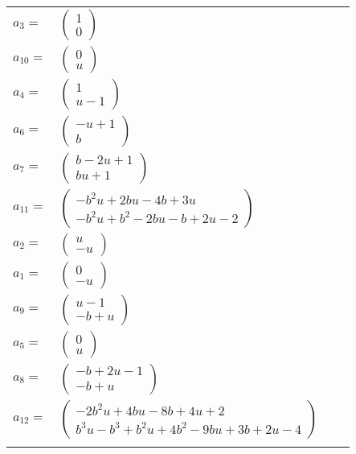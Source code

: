 \documentclass[1p]{elsarticle_modified}
\theoremstyle{definition}
\begin{document}
\begin{tabular}{m{7pt} m{180pt} m{7pt} m{180pt} }
\flushright $a_{3}=$&$\begin{pmatrix}1\\0\end{pmatrix}$ \\
\flushright $a_{10}=$&$\begin{pmatrix}0\\u\end{pmatrix}$ \\
\flushright $a_{4}=$&$\begin{pmatrix}1\\u-1\end{pmatrix}$ \\
\flushright $a_{6}=$&$\begin{pmatrix}- u+1\\b\end{pmatrix}$ \\
\flushright $a_{7}=$&$\begin{pmatrix}b-2 u+1\\b u+1\end{pmatrix}$ \\
\flushright $a_{11}=$&$\begin{pmatrix}- b^2 u+2 b u-4 b+3 u\\- b^2 u+b^2-2 b u- b+2 u-2\end{pmatrix}$ \\
\flushright $a_{2}=$&$\begin{pmatrix}u\\- u\end{pmatrix}$ \\
\flushright $a_{1}=$&$\begin{pmatrix}0\\- u\end{pmatrix}$ \\
\flushright $a_{9}=$&$\begin{pmatrix}u-1\\- b+u\end{pmatrix}$ \\
\flushright $a_{5}=$&$\begin{pmatrix}0\\u\end{pmatrix}$ \\
\flushright $a_{8}=$&$\begin{pmatrix}- b+2 u-1\\- b+u\end{pmatrix}$ \\
\flushright $a_{12}=$&$\begin{pmatrix}-2 b^2 u+4 b u-8 b+4 u+2\\b^3 u- b^3+b^2 u+4 b^2-9 b u+3 b+2 u-4\end{pmatrix}$\\&\end{tabular}
\end{document}
